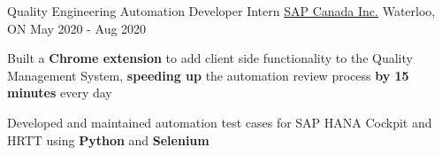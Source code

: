 \begin{cventries}
  \cventry
    {Quality Engineering Automation Developer Intern} %
    {\href{https://www.sap.com/canada/index.html}{SAP Canada Inc.}} %
    {Waterloo, ON} %
    {May 2020 - Aug 2020} %
    {
      \begin{cvitems} %
      \item {Built a \textbf{Chrome extension} to add client side functionality to the Quality Management System, \textbf{speeding up} the automation review process \textbf{by 15 minutes} every day}
      \item {Developed and maintained automation test cases for SAP HANA Cockpit and HRTT using \textbf{Python} and \textbf{Selenium}}
      \end{cvitems}
    }
       
\end{cventries}

